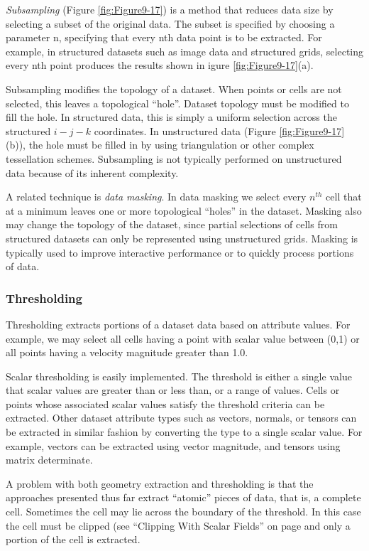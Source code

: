 \emph{Subsampling} (Figure \ref{fig:Figure9-17}) is a method that reduces data size by selecting a subset of the original data. The subset is specified by choosing a parameter n, specifying that every nth data point is to be extracted. For example, in structured datasets such as image data and structured grids, selecting every nth point produces the results shown in igure \ref{fig:Figure9-17}(a).

Subsampling modifies the topology of a dataset. When points or cells are not selected, this leaves a topological ``hole''. Dataset topology must be modified to fill the hole. In structured data, this is simply a uniform selection across the structured $i-j-k$ coordinates. In unstructured data (Figure \ref{fig:Figure9-17}(b)), the hole must be filled in by using triangulation or other complex tessellation schemes. Subsampling is not typically performed on unstructured data because of its inherent complexity.

A related technique is \emph{data masking}. In data masking we select every $n^{th}$ cell that at a minimum leaves one or more topological ``holes'' in the dataset. Masking also may change the topology of the dataset, since partial selections of cells from structured datasets can only be represented using unstructured grids. Masking is typically used to improve interactive performance or to quickly process portions of data.

\subsubsection{Thresholding}

Thresholding extracts portions of a dataset data based on attribute values. For example, we may select all cells having a point with scalar value between (0,1) or all points having a velocity magnitude greater than 1.0.

Scalar thresholding is easily implemented. The threshold is either a single value that scalar values are greater than or less than, or a range of values. Cells or points whose associated scalar values satisfy the threshold criteria can be extracted. Other dataset attribute types such as vectors, normals, or tensors can be extracted in similar fashion by converting the type to a single scalar value. For example, vectors can be extracted using vector magnitude, and tensors using matrix determinate.

A problem with both geometry extraction and thresholding is that the approaches presented thus far extract ``atomic'' pieces of data, that is, a complete cell. Sometimes the cell may lie across the boundary of the threshold. In this case the cell must be clipped (see ``Clipping With Scalar Fields'' on page \pageref{subsec:clipping_with_scalar_fields} and only a portion of the cell is extracted.

